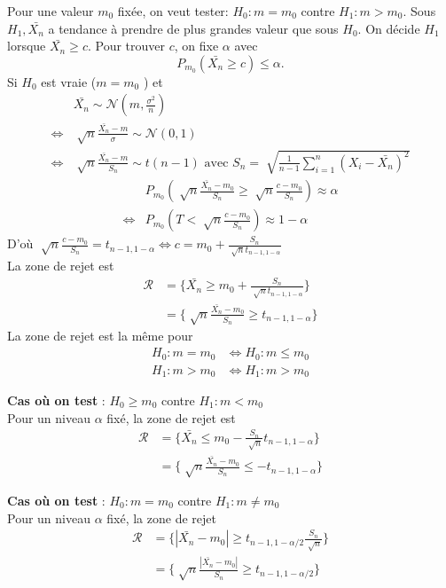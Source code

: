 \documentclass{article}
\theoremstyle{plain}%
\theoremstyle{definition}
\theoremstyle{remark}
\begin{document}
Pour une valeur $ m_0 $ fixée, on veut tester: $ H_0: m=m_0 $ contre $ H_1: m > m_0 $. Sous $ H_1, \bar{X_n} $ a tendance à prendre de plus grandes valeur que sous $ H_0 $. On décide $ H_1 $ lorsque $ \bar{X_n} \geq c $. Pour trouver $ c $, on fixe $ \alpha  $ avec 
\[
    P_{m_0} (\bar{X_n} \geq c) \leq \alpha 
.\]
Si $ H_0 $ est vraie ($ m=m_0 $ ) et 
\begin{align*}
            &\bar{X_n} \sim \mathcal{N}(m, \frac{\sigma ^2}{n}) \\
    \Leftrightarrow & \sqrt[]{n} \frac{\bar{X_n} -m }{\sigma} \sim \mathcal{N}(0,1) \\
    \Leftrightarrow & \sqrt[]{n} \frac{\bar{X_n} - m}{S_n} \sim t(n-1) \text{ avec } S_n = \sqrt[]{\frac{1}{n-1} \sum_{i=1}^{n} (X_i - \bar{X_n})^2 }
\end{align*}
\begin{align*}
    &P_{m_0} (\sqrt[]{n} \frac{\bar{X_n} - m_0 }{S_n} \geq  \sqrt[]{n} \frac{c - m_0}{S_n}) \approx \alpha \\
    \Leftrightarrow & P_{m_0} (T < \sqrt[]{n} \frac{c - m_0}{S_n}) \approx  1- \alpha
\end{align*}
D'où $ \sqrt[]{n} \frac{c - m_0}{S_n} = t_{n-1 , 1 - \alpha } \Leftrightarrow c = m_0 + \frac{S_n}{\sqrt[]{n} t_{n-1, 1-\alpha }}$\\
La zone de rejet est 
\begin{align*}
    \mathcal{R} &= \{\bar{X_n} \geq  m_0 + \frac{S_n}{\sqrt[]{n} t_{n-1, 1-\alpha }}\} \\
    &= \{\sqrt[]{n} \frac{ \bar{X_n} - m_0 }{S_n} \geq  t_{n-1, 1 - \alpha }\}
\end{align*}
La zone de rejet est la même pour \begin{align*}
    H_0: m=m_0 &\Leftrightarrow H_0 : m \leq m_0 \\
    H_1 : m > m_0 &\Leftrightarrow H_1: m>m_0
\end{align*}

\textbf{Cas où on test} : $ H_0 \geq m_0 $ contre $ H_1: m < m_0 $ \\
Pour un niveau $ \alpha  $ fixé, la zone de rejet est 
\begin{align*}
    \mathcal{R} &= \{\bar{X_n} \leq m_0 - \frac{S_n}{\sqrt[]{n}} t_{n-1, 1-\alpha }\} \\
    &= \{\sqrt[]{n} \frac{\bar{X_n} - m_0}{S_n} \leq - t_{n-1, 1-\alpha }\}
\end{align*}

\textbf{Cas où on test} : $ H_0: m=m_0 $ contre $ H_1: m \neq m_0 $ \\
Pour un niveau $ \alpha  $ fixé, la zone de rejet 
\begin{align*}
    \mathcal{R} &= \{ \left| \bar{X_n} - m_0 \right|  \geq  t_{n-1, 1-\alpha /2 } \frac{S_n}{\sqrt[]{n}}\} \\
    &= \{\sqrt[]{n} \frac{\left| \bar{X_n} - m_0 \right| }{S_n} \geq  t_{n-1, 1 - \alpha /2}\}
\end{align*}
\end{document}
